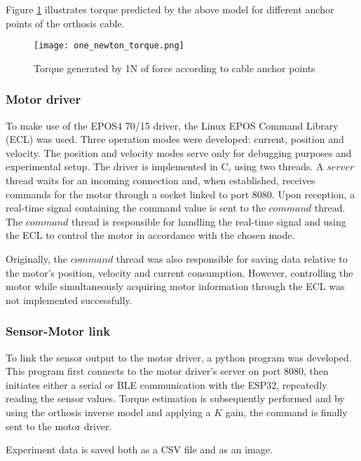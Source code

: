 Figure \ref{fig:model_1N} illustrates torque predicted by the above model for 
different anchor points of the orthosis cable. 

\begin{figure}[htbp]
  \centering
  \texttt{[image: one\_newton\_torque.png]}
  \caption{Torque generated by 1N of force according to cable anchor points}
  \label{fig:model_1N}
\end{figure}
\FloatBarrier

\subsubsection{Motor driver}
To make use of the EPOS4 70/15 driver, the Linux EPOS Command Library (ECL) was used.  
Three operation modes were developed: current, position and velocity. The position 
and velocity modes serve only for debugging purposes and experimental setup. The driver
is implemented in C, using two threads. A $server$ thread waits for an incoming 
connection and, when established, receives commands for the motor through a socket 
linked to port 8080. Upon reception, a real-time signal containing the command value 
is sent to the $command$ thread. The $command$ thread is responsible for handling 
the real-time signal and using the ECL to control the motor in accordance with the 
chosen mode.  

Originally, the $command$ thread was also responsible for saving data relative to 
the motor's position, velocity and current consumption. However, controlling the 
motor while simultaneously acquiring motor information through the ECL was not 
implemented successfully.  
\FloatBarrier

\subsubsection{Sensor-Motor link}
To link the sensor output to the motor driver, a python program was developed. 
This program first connects to the motor driver's server on port 8080, then 
initiates either a serial or BLE communication with the ESP32, repeatedly reading 
the sensor values. Torque estimation is subsequently performed and by using the 
orthosis inverse model and applying a $K$ gain, the command is finally sent to 
the motor driver.  

Experiment data is saved both as a CSV file and as an image.  
